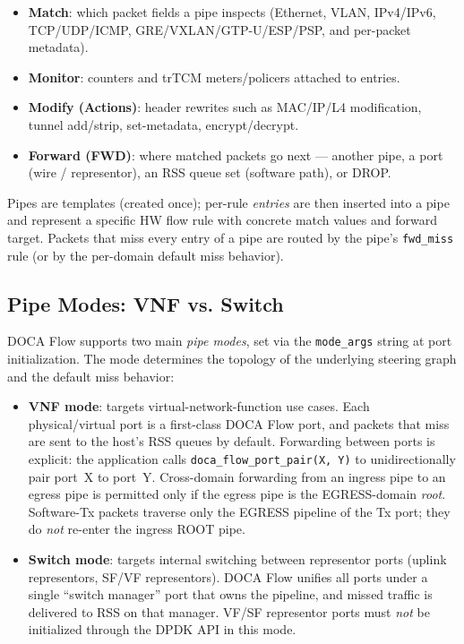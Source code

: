 \documentclass[conference]{IEEEtran}
\newcommand{\code}[1]{\nolinkurl{#1}}
\begin{document}
\begin{itemize}
  \item \textbf{Match}: which packet fields a pipe inspects (Ethernet,
        VLAN, IPv4/IPv6, TCP/UDP/ICMP, GRE/VXLAN/GTP-U/ESP/PSP, and
        per-packet metadata).
  \item \textbf{Monitor}: counters and trTCM meters/policers attached
        to entries.
  \item \textbf{Modify (Actions)}: header rewrites such as MAC/IP/L4
        modification, tunnel add/strip, set-metadata,
        encrypt/decrypt.
  \item \textbf{Forward (FWD)}: where matched packets go next ---
        another pipe, a port (wire / representor), an RSS queue set
        (software path), or DROP.
\end{itemize}

Pipes are templates (created once); per-rule \emph{entries} are then
inserted into a pipe and represent a specific HW flow rule with
concrete match values and forward target.  Packets that miss every
entry of a pipe are routed by the pipe's \texttt{fwd\_miss} rule (or
by the per-domain default miss behavior).

\subsection{Pipe Modes: VNF vs. Switch}

DOCA Flow supports two main \emph{pipe modes}, set via the
\code{mode_args} string at port initialization.  The mode determines
the topology of the underlying steering graph and the default miss
behavior:

\begin{itemize}
  \item \textbf{VNF mode}: targets virtual-network-function use cases.
        Each physical/virtual port is a first-class DOCA Flow port,
        and packets that miss are sent to the host's RSS queues by
        default.  Forwarding between ports is explicit: the
        application calls \code{doca_flow_port_pair(X, Y)} to
        unidirectionally pair port~X to port~Y.  Cross-domain
        forwarding from an ingress pipe to an egress pipe is
        permitted only if the egress pipe is the EGRESS-domain
        \emph{root}.  Software-Tx packets traverse only the EGRESS
        pipeline of the Tx port; they do \emph{not} re-enter the
        ingress ROOT pipe.

  \item \textbf{Switch mode}: targets internal switching between
        representor ports (uplink representors, SF/VF representors).
        DOCA Flow unifies all ports under a single ``switch manager''
        port that owns the pipeline, and missed traffic is delivered
        to RSS on that manager.  VF/SF representor ports must
        \emph{not} be initialized through the DPDK API in this mode.
\end{itemize}
\end{document}
